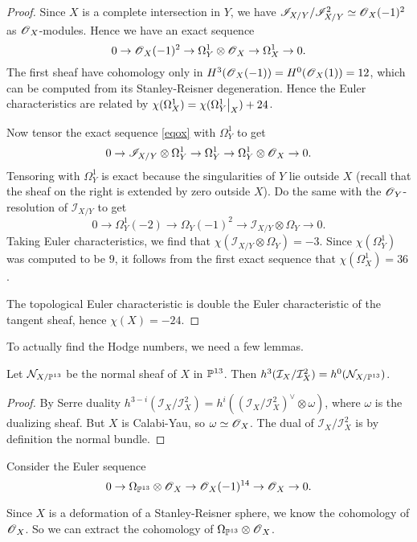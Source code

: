 \documentclass[11pt, english]{article}
\begin{document}
\begin{proof}
Since $X$ is a complete intersection in $Y$, we have $\mathscr I_{X/Y}/\mathscr I_{X/Y}^2 \simeq \operatorname{\mathscr{O}}_X(-1)^2$ as $\operatorname{\mathscr{O}}_X$-modules. Hence we have an exact sequence
\[
0 \to \operatorname{\mathscr{O}}_X(-1)^2 \to \Omega_Y^1 \otimes \operatorname{\mathscr{O}}_X \to \Omega_X^1 \to 0.
\]
The first sheaf have cohomology only in $H^3(\operatorname{\mathscr{O}}_X(-1))=H^0(\operatorname{\mathscr{O}}_X(1))=12$, which can be computed from its Stanley-Reisner degeneration. Hence the Euler characteristics are related by $\chi(\Omega_X^1) = \chi(\restr{\Omega_Y^1}X) + 24$.

Now tensor the exact sequence \eqref{eqox} with $\Omega_Y^1$ to get
\[
0 \to \mathscr I_{X/Y} \otimes \Omega_Y^1 \to \Omega_Y^1 \to \Omega_Y^1 \otimes \operatorname{\mathscr{O}}_X \to 0.
\]
Tensoring with $\Omega_Y^1$ is exact because the singularities of $Y$ lie outside $X$ (recall that the sheaf on the right is extended by zero outside $X$). Do the same with the $\operatorname{\mathscr{O}}_Y$-resolution of $\mathscr I_{X/Y}$ to get
\[
0 \to \Omega_Y^1(-2) \to \Omega_Y(-1)^2 \to \mathscr I_{X/Y} \otimes \Omega_Y \to 0.
\]
Taking Euler characteristics, we find that $\chi(\mathscr I_{X/Y} \otimes \Omega_Y)=-3$. Since $\chi(\Omega_Y^1)$ was computed to be $9$, it follows from the first exact sequence that $\chi(\Omega_X^1)=36$.

The topological Euler characteristic is double the Euler characteristic of the tangent sheaf, hence $\chi(X)=-24$.
\end{proof}

To actually find the Hodge numbers, we need a few lemmas.

\begin{lemma}
\label{lemmanormal}
Let $\mathcal N_{X/\mathbb{P}^{13}}$ be the normal sheaf of $X$ in $\mathbb{P}^{13}$. Then $h^3(\mathcal I_X/\mathcal I_X^2) = h^0(\mathcal N_{X/\mathbb{P}^{13}})$.
\end{lemma}
\begin{proof}
By Serre duality $h^{3-i}(\mathcal I_X/\mathcal I_X^2)=h^{i}((\mathcal I_X/\mathcal I_X^2)^\vee \otimes \omega)$, where $\omega$ is the dualizing sheaf. But $X$ is Calabi-Yau, so $\omega \simeq \operatorname{\mathscr{O}}_X$. The dual of $\mathcal I_X/\mathcal I_X^2$ is by definition the normal bundle.
\end{proof}

Consider the Euler sequence
\[
0 \to \Omega_{\mathbb{P}^{13}} \otimes \operatorname{\mathscr{O}}_{X} \to \operatorname{\mathscr{O}}_{X}(-1)^{14} \to \operatorname{\mathscr{O}}_X \to 0.
\]

Since $X$ is a deformation of a Stanley-Reisner sphere, we know the cohomology of $\operatorname{\mathscr{O}}_X$. So we can extract the cohomology of $\Omega_{\mathbb{P}^{13}} \otimes \operatorname{\mathscr{O}}_X$.
\end{document}
